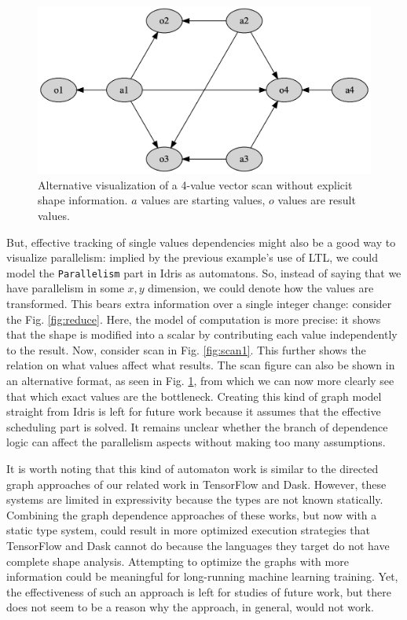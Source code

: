 \documentclass{report}
\begin{document}
\begin{figure}
  \centering
  \includegraphics[scale=0.25]{scan2.png}
  \caption{Alternative visualization of a 4-value vector scan without explicit shape information. $a$ values are starting values, $o$ values are result values.}
  \label{fig:scan2}
\end{figure}

But, effective tracking of single values dependencies might also be a good way to visualize parallelism: implied by the previous example's use of \gls{LTL}, we could model the \verb|Parallelism| part in Idris as automatons. So, instead of saying that we have parallelism in some $x,y$ dimension, we could denote how the values are transformed. This bears extra information over a single integer change: consider the Fig. \ref{fig:reduce}. Here, the model of computation is more precise: it shows that the shape is modified into a scalar by contributing each value independently to the result. Now, consider scan in Fig. \ref{fig:scan1}. This further shows the relation on what values affect what results. The scan figure can also be shown in an alternative format, as seen in Fig. \ref{fig:scan2}, from which we can now more clearly see that which exact values are the bottleneck. Creating this kind of graph model straight from Idris is left for future work because it assumes that the effective scheduling part is solved. It remains unclear whether the branch of dependence logic can affect the parallelism aspects without making too many assumptions.

It is worth noting that this kind of automaton work is similar to the directed graph approaches of our related work in TensorFlow and Dask. However, these systems are limited in expressivity because the types are not known statically. Combining the graph dependence approaches of these works, but now with a static type system, could result in more optimized execution strategies that TensorFlow and Dask cannot do because the languages they target do not have complete shape analysis. Attempting to optimize the graphs with more information could be meaningful for long-running machine learning training. Yet, the effectiveness of such an approach is left for studies of future work, but there does not seem to be a reason why the approach, in general, would not work.
\end{document}
